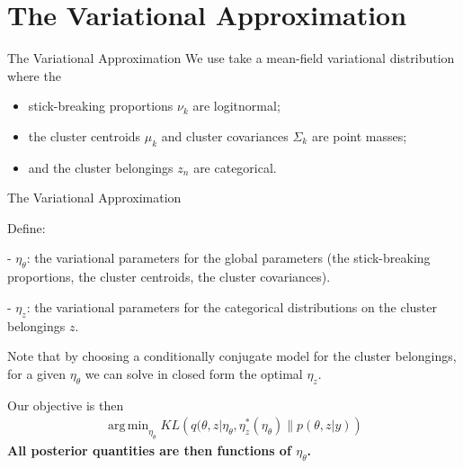 \documentclass[10pt]{beamer}\usepackage[]{graphicx}\usepackage[]{color}
\DeclareMathOperator*{\argmin}{arg\,min}
\begin{document}
\section{The Variational Approximation}

\begin{frame}{The Variational Approximation}
We use take a mean-field variational distribution where the 
\begin{itemize}
\item stick-breaking proportions $\nu_k$ are logitnormal; 
\item the cluster centroids $\mu_k$ and cluster covariances $\Sigma_k$ are point masses; 
\item and the cluster belongings $z_n$ are categorical. 
\end{itemize}
\end{frame}


\begin{frame}{The Variational Approximation}

Define:

- $\eta_\theta$: the variational parameters for the global parameters
(the stick-breaking proportions, the cluster centroids, the cluster covariances).

- $\eta_z$: the variational parameters for the categorical distributions on the
cluster belongings $z$.

Note that by choosing a conditionally conjugate model for the cluster belongings,
for a given $\eta_\theta$ we can solve in closed form the optimal $\eta_z$.

\pause

Our objective is then
\begin{align*}
  \argmin_{\eta_\theta} KL\left(
      q(\theta, z \vert \eta_\theta, \eta_z^*(\eta_\theta) \big\| p(\theta, z | y)
      \right)
\end{align*}
%
{\bf All posterior quantities are then functions of $\eta_\theta$. }

\end{frame}
\end{document}
